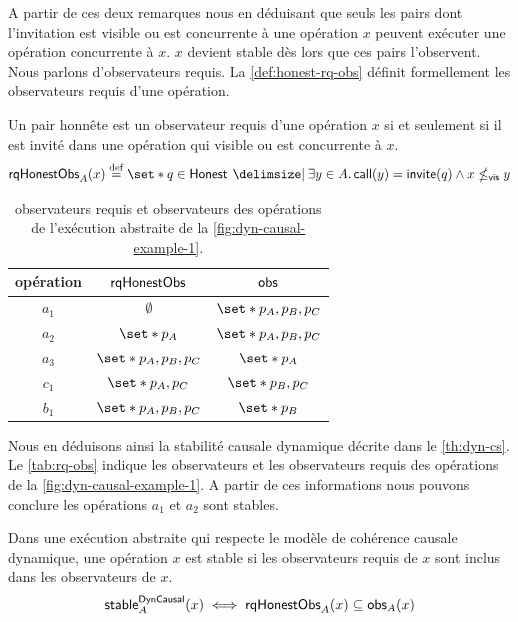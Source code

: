 A partir de ces deux remarques nous en déduisant que seuls les pairs dont l'invitation est visible ou est concurrente à une opération $x$ peuvent exécuter une opération concurrente à $x$.
$x$ devient stable dès lors que ces pairs l'observent.
Nous parlons d'observateurs requis.
La \autoref{def:honest-rq-obs} définit formellement les observateurs requis d'une opération.

\begin{definition}\label{def:honest-rq-obs}
Un pair honnête est un observateur requis d'une opération $x$ si et seulement si il est invité dans une opération qui visible ou est concurrente à $x$.
\begin{equation*}
    \trm{rqHonestObs}_A(x) \defeq \set*{q \in \trm{Honest} \given \exists y \in A \qsep \trm{call}(y) = \trm{invite}(q) \land x \nviseq y}
\end{equation*}
\end{definition}


\begin{table}[htb]
    \centering
    \begin{tabular}{ccc}
        opération & $\operatorname{\mathsf{rqHonestObs}}$ & $\operatorname{\mathsf{obs}}$ \\
        \toprule
        $a_1$ & $\emptyset$ & $\set*{p_A, p_B, p_C}$ \\
        $a_2$ & $\set*{p_A}$ & $\set*{p_A, p_B, p_C}$ \\
        $a_3$ & $\set*{p_A, p_B, p_C}$ & $\set*{p_A}$ \\
        $c_1$ & $\set*{p_A, p_C}$ & $\set*{p_B, p_C}$\\
        $b_1$ & $\set*{p_A, p_B, p_C}$ & $\set*{p_B}$ \\
    \end{tabular}
    \caption[Observateurs requis]{observateurs requis et observateurs des opérations de l'exécution abstraite de la \autoref{fig:dyn-causal-example-1}.}\label{tab:rq-obs}
\end{table}

Nous en déduisons ainsi la stabilité causale dynamique décrite dans le \autoref{th:dyn-cs}.
Le \autoref{tab:rq-obs} indique les observateurs et les observateurs requis des opérations de la \autoref{fig:dyn-causal-example-1}.
A partir de ces informations nous pouvons conclure les opérations $a_1$ et $a_2$ sont stables.

\begin{theorem}\label{th:dyn-cs}
Dans une exécution abstraite qui respecte le modèle de cohérence causale dynamique, une opération $x$ est stable si les observateurs requis de $x$ sont inclus dans les observateurs de $x$.
\begin{equation*}
    \operatorname{\mathsf{stable}}_A^{\operatorname{\mathsf{DynCausal}}}(x) \iff \operatorname{\mathsf{rqHonestObs}}_A(x) \subseteq \operatorname{\mathsf{obs}}_A(x)
\end{equation*}
\end{theorem}

